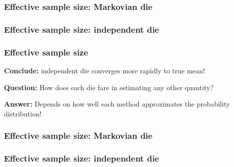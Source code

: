 \documentclass[handout]{beamer}
\begin{document}
\begin{frame}
	\frametitle{Effective sample size: Markovian die}
	
\begin{figure}[t]
	\centerline{}
\end{figure}
	
\end{frame}

\begin{frame}
	\frametitle{Effective sample size: independent die}
	
	\begin{figure}[t]
		\centerline{}
	\end{figure}
	
\end{frame}

\begin{frame}
	\frametitle{Effective sample size}
	 \textbf{Conclude:} independent die converges more rapidly to true mean!
	
	
	\textbf{Question:} How does each die fare in estimating any other quantity?
	
	\vspace{0.2cm}
	\textbf{Answer:} Depends on how well each method approximates the probability distribution!
	
	
\end{frame}

\begin{frame}
	\frametitle{Effective sample size: Markovian die}
	
	\begin{figure}[t]
		\centerline{}
	\end{figure}
	
\end{frame}

\begin{frame}
	\frametitle{Effective sample size: independent die}
	
	\begin{figure}[t]
		\centerline{}
	\end{figure}
	
\end{frame}
\end{document}
